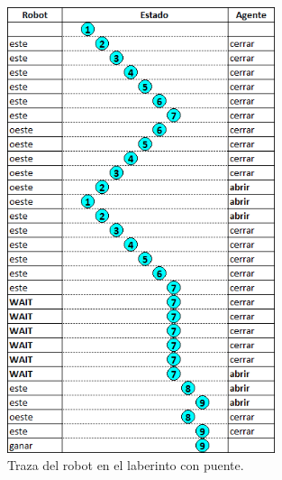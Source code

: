 \begin{figure}[H]
	\centering
		\includegraphics[width=0.7\textwidth]{Imagenes/Laberintos/puente_traza.png}
	\caption{Traza del robot en el laberinto con puente.}
	\label{fig:puente_traza}
\end{figure}
